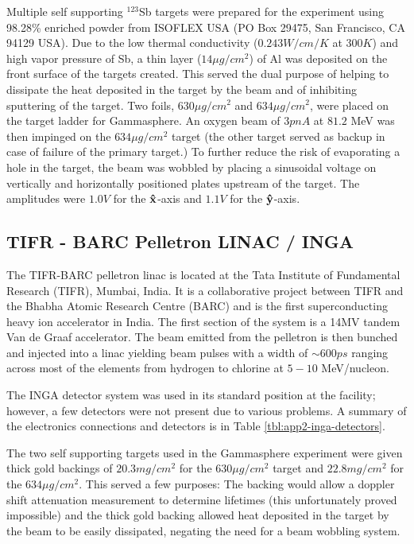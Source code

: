Multiple self supporting $^{123}$Sb targets were prepared for the experiment using 98.28\% enriched powder from ISOFLEX USA (PO Box 29475, San Francisco, CA 94129 USA)\cite{sbTargets}. Due to the low thermal conductivity ($0.243W/cm/K$ at $300K$\cite{thermalCond}) and high vapor pressure\cite{sbPartialP,sbTargets} of Sb, a thin layer ($14\mu{}g/cm^2$) of Al was deposited on the front surface of the targets created. This served the dual purpose of helping to dissipate the heat deposited in the target by the beam and of inhibiting sputtering of the target. Two foils, $630\mu{}g/cm^2$ and $634\mu{}g/cm^2$, were placed on the target ladder for Gammasphere. An oxygen beam of $3pnA$ at $81.2$ MeV was then impinged on the $634\mu{}g/cm^2$ target (the other target served as backup in case of failure of the primary target.) To further reduce the risk of evaporating a hole in the target, the beam was wobbled by placing a sinusoidal voltage on vertically and horizontally positioned plates upstream of the target. The amplitudes were $1.0V$ for the $\boldsymbol{\hat{\textbf{x}}}$-axis and $1.1V$ for the $\boldsymbol{\hat{\textbf{y}}}$-axis.

\subsection{TIFR - BARC Pelletron LINAC / INGA}
\label{ssec:exp-pr-details-inga}
The TIFR-BARC pelletron linac is located at the Tata Institute of Fundamental Research (TIFR), Mumbai, India. It is a collaborative project between TIFR and the Bhabha Atomic Research Centre (BARC) and is the first superconducting heavy ion accelerator in India. The first section of the system is a 14MV tandem Van de Graaf accelerator. The beam emitted from the pelletron is then bunched and injected into a linac yielding beam pulses with a width of $\sim{}600ps$ ranging across most of the elements from hydrogen to chlorine at $5-10$ MeV/nucleon.

The INGA detector system was used in its standard position at the facility; however, a few detectors were not present due to various problems. A summary of the electronics connections and detectors is in Table \ref{tbl:app2-inga-detectors}.

The two self supporting targets used in the Gammasphere experiment were given thick gold backings of $20.3mg/cm^2$ for the $630\mu{}g/cm^2$ target and $22.8mg/cm^2$ for the $634\mu{}g/cm^2$\cite{sbTargets}. This served a few purposes: The backing would allow a doppler shift attenuation measurement to determine lifetimes (this unfortunately proved impossible) and the thick gold backing allowed heat deposited in the target by the beam to be easily dissipated, negating the need for a beam wobbling system.


